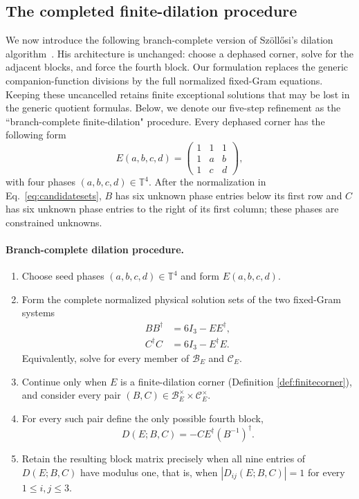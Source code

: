 \documentclass[aps,prx,reprint,nofootinbib,twoside,superscriptaddress,longbibliography,floatfix]{revtex4-2}
\theoremstyle{definition}
\newcommand{\T}{\mathbb T}
\begin{document}
\subsection{The completed finite-dilation procedure}
\label{sec:dilation}
We now introduce the following branch-complete version of Sz\"oll\H{o}si's dilation algorithm~\cite{Szollosi2012FourParameter}.
His architecture is unchanged: choose a dephased corner, solve for the adjacent blocks, and force the fourth block. Our formulation replaces the generic companion-function divisions by the full normalized fixed-Gram equations. 
Keeping these uncancelled retains finite exceptional solutions that may be lost in the generic quotient formulas. Below, we denote our five-step refinement as the ``branch-complete finite-dilation" procedure.
Every dephased corner has the following form
\begin{equation}
E(a,b,c,d)=
\begin{pmatrix}
1&1&1\\
1&a&b\\
1&c&d
\end{pmatrix},
\label{eq:singular-corner-form}
\end{equation}
with four phases $(a,b,c,d)\in\T^4$. After the normalization in Eq.~\eqref{eq:candidatesets}, $B$ has six unknown phase entries below its first row and $C$ has six unknown phase entries to the right of its first column; these phases are constrained unknowns.

\paragraph*{Branch-complete dilation procedure.}
\begin{enumerate}
\item Choose seed phases $(a,b,c,d)\in\T^4$ and form $E(a,b,c,d)$.
\item Form the complete normalized physical solution sets of the two fixed-Gram systems
\begin{equation}
\begin{aligned}
BB^{\dagger}&=6I_3-EE^{\dagger},\\
C^{\dagger}C&=6I_3-E^{\dagger}E.
\end{aligned}
\label{eq:algorithmgrams}
\end{equation}
Equivalently, solve for every member of $\mathcal B_E$ and $\mathcal C_E$.
\item Continue only when $E$ is a finite-dilation corner (Definition \ref{def:finitecorner}), and consider every pair
\hbox{$(B,C)\in\mathcal B_E^\times\times\mathcal C_E^\times$}.
\item For every such pair define the only possible fourth block,
\begin{equation}
D(E;B,C)=-CE^{\dagger}(B^{-1})^{\dagger}.
\label{eq:maincompletionformula}
\end{equation}
\item Retain the resulting block matrix precisely when all nine entries of $D(E;B,C)$ have modulus one, that is, when $|D_{ij}(E;B,C)|=1$ for every
$1\leq i,j\leq3$.
\end{enumerate}
\end{document}
